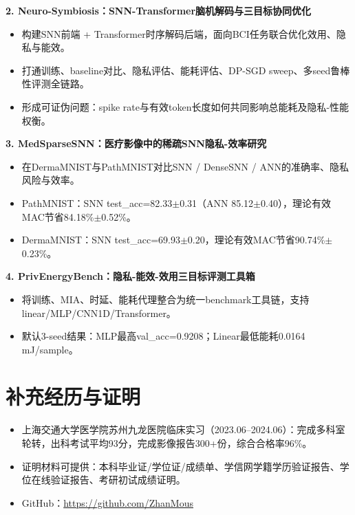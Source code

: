 \documentclass[11pt,a4paper]{ctexart}
\begin{document}
\textbf{2. Neuro-Symbiosis：SNN-Transformer脑机解码与三目标协同优化}
\begin{itemize}
  \item 构建SNN前端 + Transformer时序解码后端，面向BCI任务联合优化效用、隐私与能效。
  \item 打通训练、baseline对比、隐私评估、能耗评估、DP-SGD sweep、多seed鲁棒性评测全链路。
  \item 形成可证伪问题：spike rate与有效token长度如何共同影响总能耗及隐私-性能权衡。
\end{itemize}

\textbf{3. MedSparseSNN：医疗影像中的稀疏SNN隐私-效率研究}
\begin{itemize}
  \item 在DermaMNIST与PathMNIST对比SNN / DenseSNN / ANN的准确率、隐私风险与效率。
  \item PathMNIST：SNN test\_acc=82.33$\pm$0.31（ANN 85.12$\pm$0.40），理论有效MAC节省84.18\%$\pm$0.52\%。
  \item DermaMNIST：SNN test\_acc=69.93$\pm$0.20，理论有效MAC节省90.74\%$\pm$0.23\%。
\end{itemize}

\textbf{4. PrivEnergyBench：隐私-能效-效用三目标评测工具箱}
\begin{itemize}
  \item 将训练、MIA、时延、能耗代理整合为统一benchmark工具链，支持linear/MLP/CNN1D/Transformer。
  \item 默认3-seed结果：MLP最高val\_acc=0.9208；Linear最低能耗0.0164 mJ/sample。
\end{itemize}

\section*{补充经历与证明}
\begin{itemize}
  \item 上海交通大学医学院苏州九龙医院临床实习（2023.06--2024.06）：完成多科室轮转，出科考试平均93分，完成影像报告300+份，综合合格率96\%。
  \item 证明材料可提供：本科毕业证/学位证/成绩单、学信网学籍学历验证报告、学位在线验证报告、考研初试成绩证明。
  \item GitHub：\href{https://github.com/ZhanMous}{https://github.com/ZhanMous}
\end{itemize}
\end{document}
